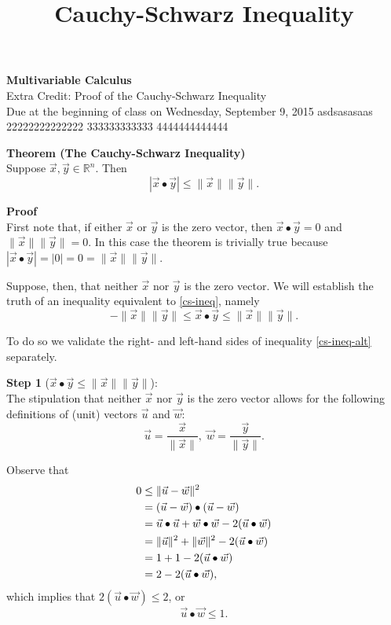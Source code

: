 \documentclass[11pt]{article}
\begin{document}
\title{Cauchy-Schwarz Inequality}

\thispagestyle{empty}

\begin{center}
{\LARGE \bf Multivariable Calculus}\\
{\large Extra Credit: Proof of the Cauchy-Schwarz Inequality}\\
Due at the beginning of class on Wednesday, September 9, 2015
asdsasasaas
22222222222222
333333333333
4444444444444
\end{center}

\textbf{Theorem (The Cauchy-Schwarz Inequality)}\\
Suppose $\vec{x},\vec{y} \in \mathbb{R}^n$. Then 
\begin{equation}
|\vec{x} \bullet \vec{y}| \le \|\vec{x}\| \|\vec{y}\| \label{cs-ineq}.
\end{equation}

\textbf{Proof}\\
First note that, if either $\vec{x}$ or $\vec{y}$ is the zero vector, 
then $\vec{x} \bullet \vec{y} = 0$ and $\|\vec{x}\| \|\vec{y}\| = 0$. 
In this case the theorem is trivially true because 
$|\vec{x} \bullet \vec{y}| = |0| = 0 = \|\vec{x}\| \|\vec{y}\|$.

Suppose, then, that neither $\vec{x}$ nor $\vec{y}$ is the zero vector. 
We will establish the truth of an inequality equivalent to \eqref{cs-ineq}, 
namely
\begin{equation}
-\|\vec{x}\| \|\vec{y}\| \le \vec{x} \bullet \vec{y} \le 
\|\vec{x}\| \|\vec{y}\|. \label{cs-ineq-alt}
\end{equation}
  
To do so we validate the right- and left-hand sides of inequality 
\eqref{cs-ineq-alt} separately.

\textbf{Step 1} ($\vec{x} \bullet \vec{y} \le \|\vec{x}\| \|\vec{y}\|$):\\
The stipulation that neither $\vec{x}$ nor $\vec{y}$ is the zero vector 
allows for the following definitions of (unit) vectors $\vec{u}$ and $\vec{w}$:
\begin{equation}
\vec{u} = \frac{\vec{x}}{\|\vec{x}\|}, \; \vec{w} = 
\frac{\vec{y}}{\|\vec{y}\|}. \label{def1}
\end{equation}

Observe that
\begin{align}
0 & \le \|\vec{u}-\vec{w}\|^2 \notag\\
  & =(\vec{u}-\vec{w}) \bullet (\vec{u}-\vec{w}) \notag\\
  & = \vec{u} \bullet \vec{u} + \vec{w} \bullet \vec{w} - 2(\vec{u}\bullet\vec{w}) \notag\\
  & = \|\vec{u}\|^2 + \|\vec{w}\|^2 - 2(\vec{u} \bullet \vec{w}) \notag\\
  & = 1 + 1 - 2(\vec{u} \bullet \vec{w}) \notag\\
  & = 2 - 2(\vec{u} \bullet \vec{w}) \label{eq1},
\end{align}
which implies that $2(\vec{u} \bullet \vec{w}) \le 2$, or
\begin{equation}
  \vec{u} \bullet \vec{w} \le 1. \label{final}
\end{equation}
\end{document}
